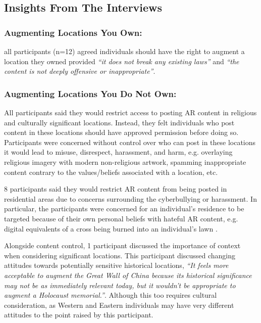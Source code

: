 \subsection{Insights From The Interviews}
\label{results:interviews}

\subsubsection{\textbf{Augmenting Locations You Own:}} all participants (n=12) agreed individuals should have the right to augment a location they owned provided \textit{``it does not break any existing laws''} and \textit{``the content is not deeply offensive or inappropriate''}. 


\subsubsection{\textbf{Augmenting Locations You Do Not Own:}} 
All participants said they would restrict access to posting AR content in religious and culturally significant locations.
Instead, they felt individuals who post content in these locations should have approved permission before doing so. 
Participants were concerned without control over who can post in these locations it would lead to misuse, disrespect, harassment, and harm, e.g. overlaying religious imagery with modern non-religious artwork, spamming inappropriate content contrary to the values/beliefs associated with a location, etc. 

8 participants said they would restrict AR content from being posted in residential areas due to concerns surrounding the cyberbullying or harassment. 
In particular, the participants were concerned for an individual's residence to be targeted because of their own personal beliefs with hateful AR content, e.g. digital equivalents of a cross being burned into an individual's lawn \cite{mum-essay}. 

Alongside content control, 1 participant discussed the importance of context when considering significant locations. 
This participant discussed changing attitudes towards potentially sensitive historical locations, \textit{“It feels more acceptable to augment the Great Wall of China because its historical significance may not be as immediately relevant today, but it wouldn't be appropriate to augment a Holocaust memorial.”}.
Although this too requires cultural consideration, as Western and Eastern individuals may have very different attitudes to the point raised by this participant.



